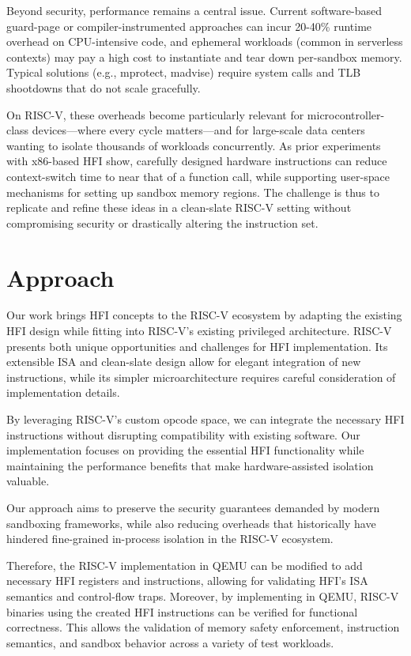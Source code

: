 \documentclass[conference,compsoc]{IEEEtran}
\begin{document}
Beyond security, performance remains a central issue. Current software-based guard-page or compiler-instrumented approaches can incur 20-40\% runtime overhead on CPU-intensive code, and ephemeral workloads (common in serverless contexts) may pay a high cost to instantiate and tear down per-sandbox memory. Typical solutions (e.g., mprotect, madvise) require system calls and TLB shootdowns that do not scale gracefully.

On RISC-V, these overheads become particularly relevant for microcontroller-class devices—where every cycle matters—and for large-scale data centers wanting to isolate thousands of workloads concurrently. As prior experiments with x86-based HFI show, carefully designed hardware instructions can reduce context-switch time to near that of a function call, while supporting user-space mechanisms for setting up sandbox memory regions. The challenge is thus to replicate and refine these ideas in a clean-slate RISC-V setting without compromising security or drastically altering the instruction set.

\section{Approach}
\label{sec:approach}

Our work brings HFI concepts to the RISC-V ecosystem by adapting the existing HFI design while fitting into RISC-V's existing privileged architecture. 
RISC-V presents both unique opportunities and challenges for HFI implementation. Its extensible ISA and clean-slate design allow for elegant integration of new instructions, while its simpler microarchitecture requires careful consideration of implementation details.

By leveraging RISC-V's custom opcode space, we can integrate the necessary HFI instructions without disrupting compatibility with existing software. 
Our implementation focuses on providing the essential HFI functionality while maintaining the performance benefits that make hardware-assisted isolation valuable.

Our approach aims to preserve the security guarantees demanded by modern sandboxing frameworks, while also reducing overheads that historically have hindered fine-grained in-process isolation in the RISC-V ecosystem.

Therefore, the RISC-V implementation in QEMU can be modified to add necessary HFI registers and instructions, allowing for validating HFI's ISA semantics and control-flow traps. 
Moreover, by implementing in QEMU, RISC-V binaries using the created HFI instructions can be verified for functional correctness.
This allows the validation of memory safety enforcement, instruction semantics, and sandbox behavior across a variety of test workloads.
\end{document}
